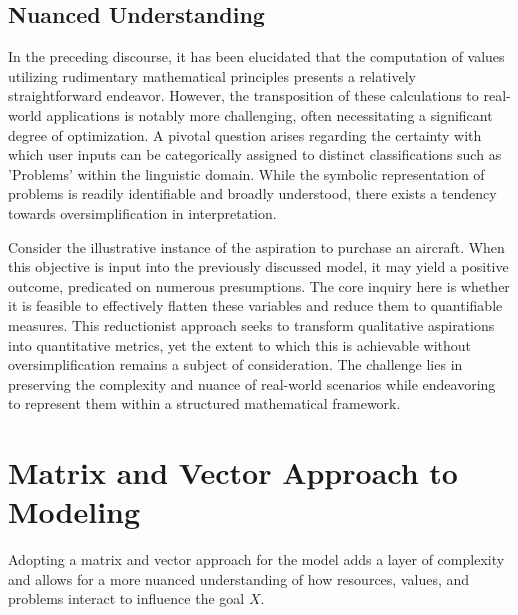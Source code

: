 \documentclass{article}
\begin{document}
\subsection{Nuanced Understanding}

In the preceding discourse, it has been elucidated that the computation of values utilizing rudimentary mathematical principles presents a relatively straightforward endeavor. However, the transposition of these calculations to real-world applications is notably more challenging, often necessitating a significant degree of optimization. A pivotal question arises regarding the certainty with which user inputs can be categorically assigned to distinct classifications such as 'Problems' within the linguistic domain. While the symbolic representation of problems is readily identifiable and broadly understood, there exists a tendency towards oversimplification in interpretation. 

Consider the illustrative instance of the aspiration to purchase an aircraft. When this objective is input into the previously discussed model, it may yield a positive outcome, predicated on numerous presumptions. The core inquiry here is whether it is feasible to effectively flatten these variables and reduce them to quantifiable measures. This reductionist approach seeks to transform qualitative aspirations into quantitative metrics, yet the extent to which this is achievable without oversimplification remains a subject of consideration. The challenge lies in preserving the complexity and nuance of real-world scenarios while endeavoring to represent them within a structured mathematical framework.

\section*{Matrix and Vector Approach to Modeling}

Adopting a matrix and vector approach for the model adds a layer of complexity and allows for a more nuanced understanding of how resources, values, and problems interact to influence the goal \( X \).
\end{document}
